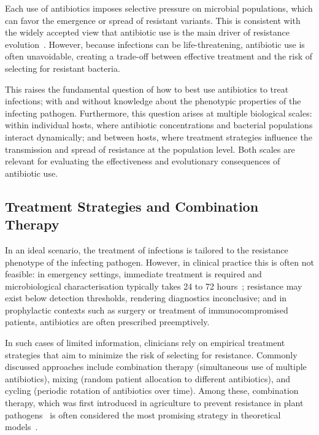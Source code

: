 \documentclass[../main.tex]{subfiles}
\begin{document}
Each use of antibiotics imposes selective pressure on microbial populations, which can favor the emergence or spread of resistant variants.
This is consistent with the widely accepted view that antibiotic use is the main driver of resistance evolution~\cite{Gregory2018}.
However, because infections can be life-threatening, antibiotic use is often unavoidable, creating a trade-off between effective treatment and the risk of selecting for resistant bacteria.

This raises the fundamental question of how to best use antibiotics to treat infections; with and without knowledge about the phenotypic properties of the infecting pathogen.
Furthermore, this question arises at multiple biological scales: within individual hosts, where antibiotic concentrations and bacterial populations interact dynamically; and between hosts, where treatment strategies influence the transmission and spread of resistance at the population level.
Both scales are relevant for evaluating the effectiveness and evolutionary consequences of antibiotic use.

\subsection{Treatment Strategies and Combination Therapy}
In an ideal scenario, the treatment of infections is tailored to the resistance phenotype of the infecting pathogen.
However, in clinical practice this is often not feasible: in emergency settings, immediate treatment is required and microbiological characterisation typically takes 24 to 72 hours~\cite{Leekha2011}; resistance may exist below detection thresholds, rendering diagnostics inconclusive; and in prophylactic contexts such as surgery or treatment of immunocompromised patients, antibiotics are often prescribed preemptively.

In such cases of limited information, clinicians rely on empirical treatment strategies that aim to minimize the risk of selecting for resistance.
Commonly discussed approaches include combination therapy (simultaneous use of multiple antibiotics), mixing (random patient allocation to different antibiotics), and cycling (periodic rotation of antibiotics over time).
Among these, combination therapy, which was first introduced in agriculture to prevent resistance in plant pathogens~\cite{Kable1980, Delp1980, Skylakakis1981} is often considered the most promising strategy in theoretical models~\cite{Bonhoeffer1997, Tepekule2017,Uecker2021}.
\end{document}
